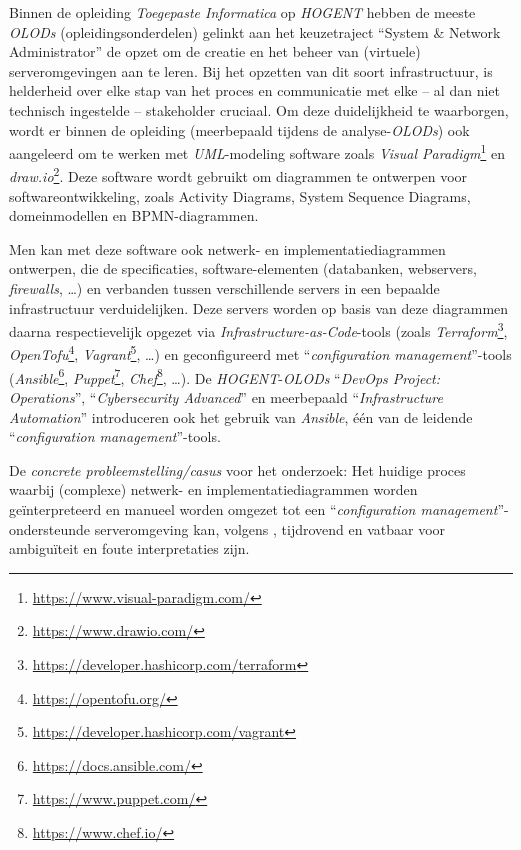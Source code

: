 
Binnen de opleiding \emph{Toegepaste Informatica} op \emph{HOGENT} hebben de meeste \emph{OLODs} (opleidingsonderdelen) gelinkt aan het keuzetraject ``System \& Network Administrator'' de opzet om de creatie en het beheer van (virtuele) serveromgevingen aan te leren. Bij het opzetten van dit soort infrastructuur, is helderheid over elke stap van het proces en communicatie met elke -- al dan niet technisch ingestelde -- stakeholder cruciaal. %
Om deze duidelijkheid te waarborgen, wordt er binnen de opleiding (meerbepaald tijdens de analyse-\emph{OLODs}) ook aangeleerd om te werken met \emph{UML}-modeling software zoals \emph{Visual Paradigm}\footnote{\url{https://www.visual-paradigm.com/}} en \emph{draw.io}\footnote{\url{https://www.drawio.com/}}. Deze software wordt gebruikt om diagrammen te ontwerpen voor softwareontwikkeling, zoals Activity Diagrams, System Sequence Diagrams, domeinmodellen en BPMN-diagrammen.

Men kan met deze software ook netwerk- en implementatiediagrammen ontwerpen, die de specificaties, software-elementen (databanken, webservers, \emph{firewalls}, \ldots) en verbanden tussen verschillende servers in een bepaalde infrastructuur verduidelijken. Deze servers worden op basis van deze diagrammen daarna respectievelijk opgezet via \emph{Infrastructure-as-Code}-tools (zoals \emph{Terraform}\footnote{\url{https://developer.hashicorp.com/terraform}}, \emph{OpenTofu}\footnote{\url{https://opentofu.org/}}, \emph{Vagrant}\footnote{\url{https://developer.hashicorp.com/vagrant}}, \ldots) en geconfigureerd met ``\emph{configuration management}''-tools (\emph{Ansible}\footnote{\url{https://docs.ansible.com/}}, \emph{Puppet}\footnote{\url{https://www.puppet.com/}}, \emph{Chef}\footnote{\url{https://www.chef.io/}}, \ldots). De \emph{HOGENT}-\emph{OLODs} ``\emph{DevOps Project: Operations}'', ``\emph{Cybersecurity Advanced}'' en meerbepaald ``\emph{Infrastructure Automation}'' introduceren ook het gebruik van \emph{Ansible}, één van de leidende ``\emph{configuration management}''-tools.

De \emph{concrete probleemstelling/casus} voor het onderzoek:
Het huidige proces waarbij (complexe) netwerk- en implementatiediagrammen worden geïnterpreteerd en manueel worden omgezet tot een ``\emph{configuration management}''-ondersteunde serveromgeving kan, volgens \textcite{Nicacio2020}, tijdrovend en vatbaar voor ambiguïteit en foute interpretaties zijn.

